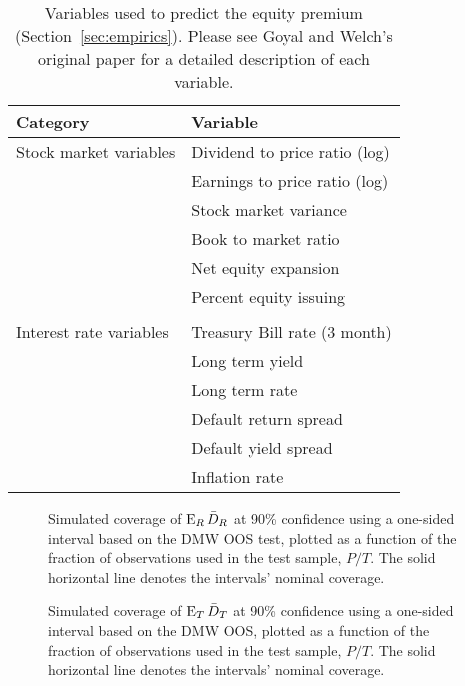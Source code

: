 \documentclass[12pt]{article}
\begin{document}
\begin{table}[tb]
  \begin{tabularx}{\linewidth}{XX}
    \toprule
    Category & Variable \\
    \midrule
    Stock market variables
    & Dividend to price ratio (log) \\
    & Earnings to price ratio (log) \\
    & Stock market variance \\
    & Book to market ratio \\
    & Net equity expansion \\
    & Percent equity issuing \\\\
    Interest rate variables
    & Treasury Bill rate (3 month) \\
    & Long term yield \\
    & Long term rate \\
    & Default return spread \\
    & Default yield spread \\
    & Inflation rate \\
    \bottomrule
  \end{tabularx}
  \caption{Variables used to predict the equity premium
    (Section~\ref{sec:empirics}).
    Please see Goyal and Welch's original paper \citep{GoW:08}
    for a detailed description of each variable.}
  \label{tab:equity}
\end{table}
\clearpage

\insamplecoefs
\insampletests

\clearpage
\begin{figure}
   
\caption{Simulated coverage of $\operatorname{E}_R \bar{D}_{R}$ at 90\% confidence using a
  one-sided interval based on the DMW
  OOS test, plotted as a function of the fraction of
  observations used in the test sample, $P/T$.  The solid horizontal
  line denotes the intervals' nominal coverage.}
 \label{fig:interval-R}
\end{figure}
\clearpage
\begin{figure}
   
\caption{Simulated coverage of $\operatorname{E}_T \bar{D}_{T}$ at 90\% confidence using a
  one-sided interval based on the DMW
  OOS, plotted as a function of the fraction of
  observations used in the test sample, $P/T$.  The solid horizontal
  line denotes the intervals' nominal coverage.}
\label{fig:interval-T}
\end{figure}
\clearpage
\end{document}
